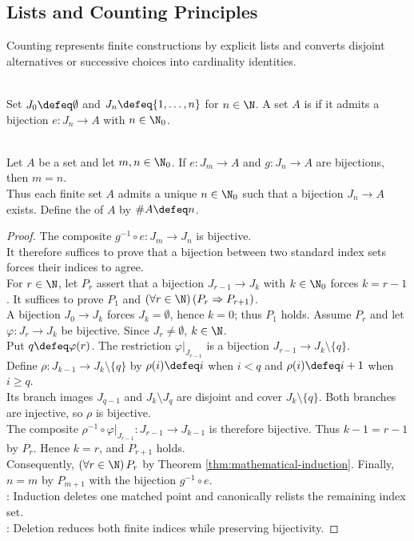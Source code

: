 \subsection{Lists and Counting Principles}

Counting represents finite constructions by explicit lists and converts disjoint alternatives or successive choices into cardinality identities.

\begin{definition} \label{def:finite-sets-and-standard-index-sets} \\
Set $J_0\defeq\emptyset$ and $J_n\defeq\{1,\ldots,n\}$ for $n\in\N$. A set $A$ is  if it admits a bijection $e:J_n\to A$ with $n\in\N_0$.
\end{definition}

\begin{proposition} \label{prop:finite-cardinality-well-defined} \\
Let $A$ be a set and let $m,n\in\N_0$. If $e:J_m\to A$ and $g:J_n\to A$ are bijections, then $m=n$.\\
Thus each finite set $A$ admits a unique $n\in\N_0$ such that a bijection $J_n\to A$ exists. Define the  of $A$ by $\#A\defeq n$.
\begin{proof}
The composite $g^{-1}\circ e:J_m\to J_n$ is bijective.\\
It therefore suffices to prove that a bijection between two standard index sets forces their indices to agree.\\
For $r\in\N$, let $P_r$ assert that a bijection $J_{r-1}\to J_k$ with $k\in\N_0$ forces $k=r-1$. It suffices to prove $P_1$ and $(\forall r\in\N)\,(P_r\Rightarrow P_{r+1})$.\\
A bijection $J_0\to J_k$ forces $J_k=\emptyset$, hence $k=0$; thus $P_1$ holds. Assume $P_r$ and let $\varphi:J_r\to J_k$ be bijective. Since $J_r\neq\emptyset$, $k\in\N$.\\
Put $q\defeq\varphi(r)$. The restriction $\left.\varphi\right|_{J_{r-1}}$ is a bijection $J_{r-1}\to J_k\setminus\{q\}$.\\
Define $\rho:J_{k-1}\to J_k\setminus\{q\}$ by $\rho(i)\defeq i$ when $i<q$ and $\rho(i)\defeq i+1$ when $i\geq q$.\\
Its branch images $J_{q-1}$ and $J_k\setminus J_q$ are disjoint and cover $J_k\setminus\{q\}$. Both branches are injective, so $\rho$ is bijective.\\
The composite $\rho^{-1}\circ\left.\varphi\right|_{J_{r-1}}:J_{r-1}\to J_{k-1}$ is therefore bijective. Thus $k-1=r-1$ by $P_r$. Hence $k=r$, and $P_{r+1}$ holds.\\
Consequently, $(\forall r\in\N)\,P_r$ by Theorem \ref{thm:mathematical-induction}. Finally, $n=m$ by $P_{m+1}$ with the bijection $g^{-1}\circ e$.\\
: Induction deletes one matched point and canonically relists the remaining index set.\\
: Deletion reduces both finite indices while preserving bijectivity.
\end{proof}
\end{proposition}

